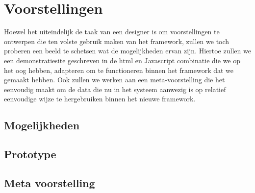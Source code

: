 \part{Voorstellingen}
\label{voorstellingen}

Hoewel het uiteindelijk de taak van een designer is om voorstellingen te ontwerpen die ten volste gebruik maken van het framework, zullen we toch proberen een beeld te schetsen wat de mogelijkheden ervan zijn. Hiertoe zullen we een demonstratiesite geschreven in de \ac{html} en Javascript combinatie die we op het oog hebben, adapteren om te functioneren binnen het framework dat we gemaakt hebben. Ook zullen we werken aan een meta-voorstelling die het eenvoudig maakt om de data die nu in het systeem aanwezig is op relatief eenvoudige wijze te hergebruiken binnen het nieuwe framework.

\chapter{Mogelijkheden}

\chapter{Prototype}

\chapter{Meta voorstelling}
